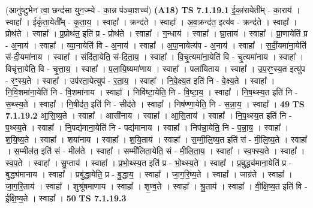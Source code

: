 \documentclass[17pt]{extarticle}
\begin{document}
                      (आनु॑ष्टुभेन त्वा॒ छन्द॑सा युन॒ज्म्ये - का॒न्न प॑ञ्चा॒शच्च॑)  \textbf{(A18)} \newline \newline
                                \textbf{ TS 7.1.19.1} \newline
                  ई॒कां॒रायेती᳚म् - का॒राय॑ । स्वाहा᳚ । ईकृं॑ता॒येती᳚म् - कृ॒ता॒य॒ । स्वाहा᳚ । क्रन्द॑ते । स्वाहा᳚ । अ॒व॒क्रन्द॑त॒ इत्य॑व - क्रन्द॑ते । स्वाहा᳚ । प्रोथ॑ते । स्वाहा᳚ । प्र॒प्रोथ॑त॒ इति॑ प्र - प्रोथ॑ते । स्वाहा᳚ । ग॒न्धाय॑ । स्वाहा᳚ । घ्रा॒ताय॑ । स्वाहा᳚ । प्रा॒णायेति॑ प्र - अ॒नाय॑ । स्वाहा᳚ । व्या॒नायेति॑ वि - अ॒नाय॑ । स्वाहा᳚ । अ॒पा॒नायेत्य॑प - अ॒नाय॑ । स्वाहा᳚ । स॒दीं॒यमा॑ना॒येति॑ सं-दी॒यमा॑नाय । स्वाहा᳚ । संदि॑ता॒येति॒ सं-दि॒ता॒य॒ । स्वाहा᳚ । वि॒चृ॒त्यमा॑ना॒येति॑ वि - चृ॒त्यमा॑नाय । स्वाहा᳚ । विचृ॑त्ता॒येति॒ वि - चृ॒त्ता॒य॒ । स्वाहा᳚ । प॒ला॒यि॒ष्यमा॑णाय । स्वाहा᳚ । पला॑यिताय । स्वाहा᳚ । उ॒प॒रꣳ॒॒स्य॒त इत्यु॑प - रꣳ॒॒स्य॒ते । स्वाहा᳚ । उप॑रता॒येत्युप॑ - र॒ता॒य॒ । स्वाहा᳚ । नि॒वे॒क्ष्य॒त इति॑ नि - वे॒क्ष्य॒ते । स्वाहा᳚ । नि॒वि॒शमा॑ना॒येति॑ नि - वि॒शमा॑नाय । स्वाहा᳚ । निवि॑ष्टा॒येति॒ नि - वि॒ष्टा॒य॒ । स्वाहा᳚ । नि॒ष॒थ्स्य॒त इति॑ नि - स॒थ्स्य॒ते । स्वाहा᳚ । नि॒षीद॑त॒ इति॑ नि - सीद॑ते । स्वाहा᳚ । निष॑ण्णा॒येति॒ नि - स॒न्ना॒य॒ । स्वाहा᳚ । \textbf{  49} \newline
                  \newline
                                \textbf{ TS 7.1.19.2} \newline
                  आ॒सि॒ष्य॒ते । स्वाहा᳚ । आसी॑नाय । स्वाहा᳚ । आ॒सि॒ताय॑ । स्वाहा᳚ । नि॒प॒थ्स्य॒त इति॑ नि - प॒थ्स्य॒ते । स्वाहा᳚ । नि॒पद्य॑माना॒येति॑ नि - पद्य॑मानाय । स्वाहा᳚ । निप॑न्ना॒येति॒ नि - प॒न्ना॒य॒ । स्वाहा᳚ । श॒यि॒ष्य॒ते । स्वाहा᳚ । शया॑नाय । स्वाहा᳚ । श॒यि॒ताय॑ । स्वाहा᳚ । स॒म्मी॒लि॒ष्य॒त इति॑ सं - मी॒लि॒ष्य॒ते । स्वाहा᳚ । स॒म्मील॑त॒ इति॑ सं - मील॑ते । स्वाहा᳚ । सम्मी॑लिता॒येति॒ सं - मी॒लि॒ता॒य॒ । स्वाहा᳚ । स्व॒फ्स्य॒ते । स्वाहा᳚ । स्व॒प॒ते । स्वाहा᳚ । सु॒प्ताय॑ । स्वाहा᳚ । प्र॒भो॒थ्स्य॒त इति॑ प्र - भो॒थ्स्य॒ते । स्वाहा᳚ । प्र॒बुद्ध्य॑माना॒येति॑ प्र - बुद्ध्य॑मानाय । स्वाहा᳚ । प्रबु॑द्धा॒येति॒ प्र - बु॒द्धा॒य॒ । स्वाहा᳚ । जा॒ग॒रि॒ष्य॒ते । स्वाहा᳚ । जाग्र॑ते । स्वाहा᳚ । जा॒ग॒रि॒ताय॑ । स्वाहा᳚ । शुश्रू॑षमाणाय । स्वाहा᳚ । शृ॒ण्व॒ते । स्वाहा᳚ । श्रु॒ताय॑ । स्वाहा᳚ । वी॒क्षि॒ष्य॒त इति॑ वि - ई॒क्षि॒ष्य॒ते । स्वाहा᳚ । \textbf{  50} \newline
                  \newline
                                \textbf{ TS 7.1.19.3} \newline
\end{document}
